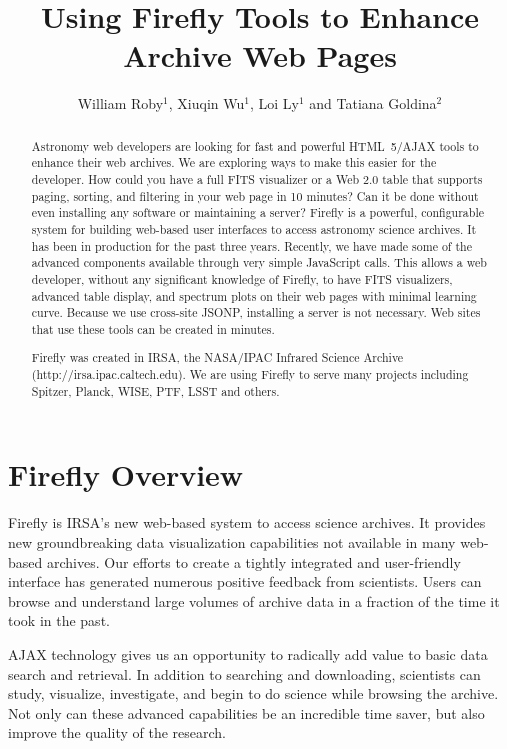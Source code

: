\documentclass[11pt,twoside]{article}
\begin{document}
\title{Using Firefly Tools to Enhance Archive Web Pages}
\author{William Roby$^1$, Xiuqin Wu$^1$, Loi Ly$^1$  and Tatiana Goldina$^2$
}

\begin{abstract}
Astronomy web developers are looking for fast and powerful \newline HTML~5/AJAX tools to enhance their web archives. We are exploring ways to make this easier for the developer. How could you have a full FITS visualizer or a Web 2.0 table that supports paging, sorting, and filtering in your web page in 10 minutes? Can it be done without even installing any software or maintaining a server?
Firefly is a powerful, configurable system for building web-based user interfaces to access astronomy science archives. It has been in
production for the past three years. Recently, we have made some of the advanced components available through very simple JavaScript
calls. 
This allows a web developer, without any significant knowledge of Firefly, to have FITS visualizers, advanced table display, and spectrum plots on their web pages with minimal learning curve. 
Because we use cross-site JSONP, installing a server is not necessary. Web sites that use these tools can be created in minutes.

Firefly was created in IRSA, the NASA/IPAC Infrared Science Archive \newline (http://irsa.ipac.caltech.edu).
We are using Firefly to serve many projects including Spitzer, Planck, WISE, PTF, LSST and others. 

\end{abstract}

\section*{Firefly Overview}
Firefly is IRSA's new web-based system to access science archives. 
It provides new groundbreaking data visualization capabilities not available in many web-based archives. 
Our efforts to create a tightly integrated and user-friendly interface has generated numerous positive feedback from scientists. 
Users can browse and understand large volumes of archive data in a fraction of the time it took in the past.

AJAX technology gives us an opportunity to radically add value to basic data search and retrieval. 
In addition to searching and downloading, scientists can study, visualize, investigate, and begin to do science
while browsing the archive. Not only can these advanced capabilities be an incredible time saver, but also improve the quality of the research.
\end{document}
